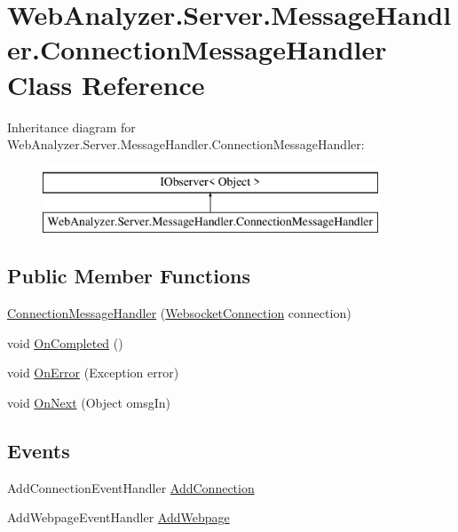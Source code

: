 \hypertarget{class_web_analyzer_1_1_server_1_1_message_handler_1_1_connection_message_handler}{}\section{Web\+Analyzer.\+Server.\+Message\+Handler.\+Connection\+Message\+Handler Class Reference}
\label{class_web_analyzer_1_1_server_1_1_message_handler_1_1_connection_message_handler}
Inheritance diagram for Web\+Analyzer.\+Server.\+Message\+Handler.\+Connection\+Message\+Handler\+:\begin{figure}[H]
\begin{center}
\leavevmode
\includegraphics[height=2.000000cm]{class_web_analyzer_1_1_server_1_1_message_handler_1_1_connection_message_handler}
\end{center}
\end{figure}
\subsection*{Public Member Functions}
\begin{DoxyCompactItemize}
\item 
\hyperlink{class_web_analyzer_1_1_server_1_1_message_handler_1_1_connection_message_handler_af2d4c77349a43145f081e572a859952c}{Connection\+Message\+Handler} (\hyperlink{class_web_analyzer_1_1_server_1_1_websocket_connection}{Websocket\+Connection} connection)
\item 
void \hyperlink{class_web_analyzer_1_1_server_1_1_message_handler_1_1_connection_message_handler_aaa544cd527eafff7dff5a3070d4479f4}{On\+Completed} ()
\item 
void \hyperlink{class_web_analyzer_1_1_server_1_1_message_handler_1_1_connection_message_handler_a79ba446b3ba3d69f715d926ce896098d}{On\+Error} (Exception error)
\item 
void \hyperlink{class_web_analyzer_1_1_server_1_1_message_handler_1_1_connection_message_handler_ac6e06ccaa5792fa911bd54d34a166eca}{On\+Next} (Object omsg\+In)
\end{DoxyCompactItemize}
\subsection*{Events}
\begin{DoxyCompactItemize}
\item 
Add\+Connection\+Event\+Handler \hyperlink{class_web_analyzer_1_1_server_1_1_message_handler_1_1_connection_message_handler_a10b402c23b0015efb4b3643a064e7f09}{Add\+Connection}
\item 
Add\+Webpage\+Event\+Handler \hyperlink{class_web_analyzer_1_1_server_1_1_message_handler_1_1_connection_message_handler_a4a1e2b8d5b77a7559db92b1e1a07aed9}{Add\+Webpage}
\end{DoxyCompactItemize}
